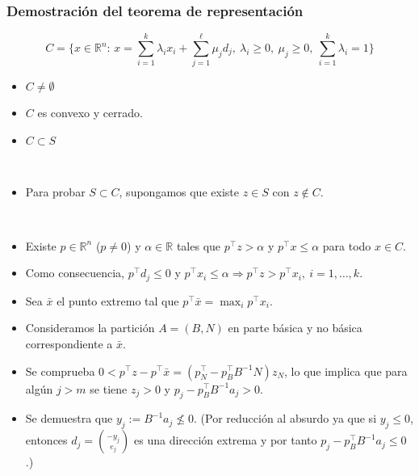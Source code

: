 \documentclass{beamer}
\begin{document}
\begin{frame}
\frametitle{Demostración del teorema de representación}

{\scriptsize
\[
C = \{x\in\mathbb{R}^n:\, x = \sum_{i=1}^k \lambda_i x_i + \sum_{j=1}^\ell
 \mu_j d_j,\ \lambda_i\geq 0,\ \mu_j\geq 0,\ \sum_{i=1}^k \lambda_i=1\}
\]

\begin{itemize}
\item $C\neq\emptyset$
\item $C$ es convexo y cerrado.
\item $C\subset S$

\

\item Para probar $S\subset C$, supongamos que existe $z\in S$ con $z\notin C$.

\

\item Existe $p\in\mathbb{R}^n$ ($p\neq 0$) y $\alpha \in\mathbb{R}$ tales que $p^\top z>\alpha$ y $p^\top x\leq \alpha$ para todo $x\in C$.
\item Como consecuencia, $p^\top d_j \leq 0$ y $p^\top x_i\leq \alpha \Rightarrow
p^\top z > p^\top x_i,\ i=1,\ldots,k$.
\item Sea $\bar{x}$ el punto extremo tal que $p^\top \bar{x} =\max_i p^\top x_i$.
\item Consideramos la partición $A=(B,N)$ en parte básica y no básica correspondiente  a $\bar{x}$.
\item Se comprueba $0 < p^\top z- p^\top \bar{x}=(p_N^\top - p_B^\top B^{-1} N) z_N$, lo que implica que para algún $j>m$ se tiene $z_j>0$ y $p_j-p_B^\top B^{-1} a_j>0$.
\item Se demuestra  que $y_j:= B^{-1}a_j\nleq 0$. (Por reducción al absurdo ya que si $y_j\leq 0$, entonces $d_j= {-y_j\choose e_j}$ es una dirección extrema y por tanto $p_j-p_B^\top B^{-1}a_j\leq 0$.)
\end{itemize}
}

\end{frame}
\end{document}
